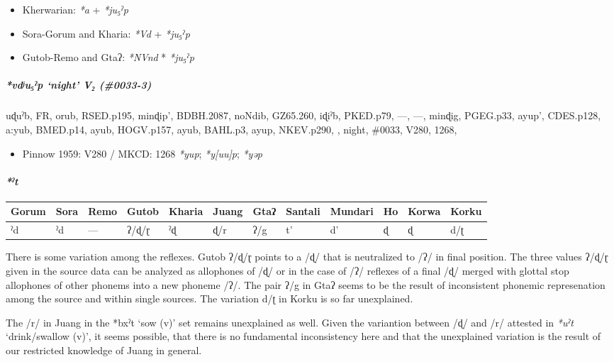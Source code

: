 \documentclass[a4paper,]{article}
\providecommand{\tightlist}{%
  \setlength{\itemsep}{0pt}\setlength{\parskip}{0pt}}
\let\oldparagraph\paragraph
\renewcommand{\paragraph}[1]{\oldparagraph{#1}\mbox{}}
\let\oldsubparagraph\subparagraph
\renewcommand{\subparagraph}[1]{\oldsubparagraph{#1}\mbox{}}
\begin{document}
\begin{itemize}
\tightlist
\item
  Kherwarian: \emph{*a} + \emph{*ju₅ˀp}
\item
  Sora-Gorum and Kharia: \emph{*Vd} + \emph{*ju₅ˀp}
\item
  Gutob-Remo and Gtaʔ: \emph{*NVnd} * \emph{*ju₅ˀp}
\end{itemize}

\subparagraph{\texorpdfstring{\emph{*vdʲu₅ˀp} `night' V₂
(\#0033-3)}{*vdʲu₅ˀp night V₂ (\#0033-3)}}\label{vdux2b2uux2c0p-night-v-0033-3-1}

uɖuˀb, FR, orub, RSED.p195, minɖip', BDBH.2087, noNdib, GZ65.260, iɖiˀb,
PKED.p79, ---, ---, minɖig, PGEG.p33, ayup', CDES.p128, a:yub, BMED.p14,
ayub, HOGV.p157, ayub, BAHL.p3, ayup, NKEV.p290, , night, \#0033, V280,
1268,

\begin{itemize}
\tightlist
\item
  Pinnow 1959: V280 / MKCD: 1268 \emph{*yup}; \emph{*y{[}uu{]}p};
  \emph{*yəp}
\end{itemize}

\paragraph{\texorpdfstring{\emph{*ˀt}}{*ˀt}}\label{ux2c0t}

\begin{longtable}[]{@{}llllllllllll@{}}
\toprule
Gorum & Sora & Remo & Gutob & Kharia & Juang & Gtaʔ & Santali & Mundari
& Ho & Korwa & Korku\tabularnewline
\midrule
\endhead
ˀd & ˀd & --- & ʔ/ɖ/ɽ & ˀɖ & ɖ/r & ʔ/g & t' & d' & ɖ & ɖ &
d/ʈ\tabularnewline
\bottomrule
\end{longtable}

There is some variation among the reflexes. Gutob ʔ/ɖ/ɽ points to a /ɖ/
that is neutralized to /ʔ/ in final position. The three values ʔ/ɖ/ɽ
given in the source data can be analyzed as allophones of /ɖ/ or in the
case of /ʔ/ reflexes of a final /ɖ/ merged with glottal stop allophones
of other phonems into a new phoneme /ʔ/. The pair ʔ/g in Gtaʔ seems to
be the result of inconsistent phonemic represenation among the source
and within single sources. The variation d/ʈ in Korku is so far
unexplained.

The /r/ in Juang in the *bxˀt `sow (v)' set remains unexplained as well.
Given the variantion between /ɖ/ and /r/ attested in \emph{*uˀt}
`drink/swallow (v)', it seems possible, that there is no fundamental
inconsistency here and that the unexplained variation is the result of
our restricted knowledge of Juang in general.
\end{document}
